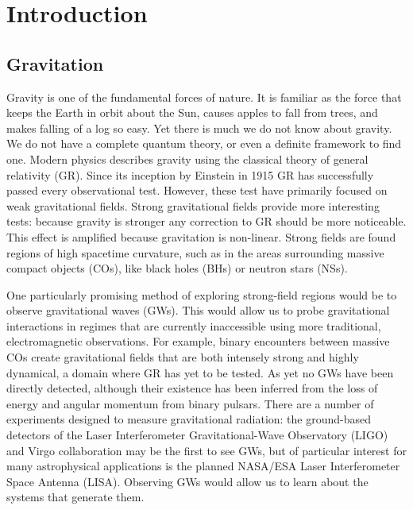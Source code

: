 \chapter{Introduction}\setcounter{page}{1}

\section{Gravitation}

Gravity is one of the fundamental forces of nature. It is familiar as the force that keeps the Earth in orbit about the Sun, causes apples to fall from trees, and makes falling of a log so easy. Yet there is much we do not know about gravity. We do not have a complete quantum theory, or even a definite framework to find one. Modern physics describes gravity using the classical theory of general relativity (GR)\cite{Misner1973}. Since its inception by Einstein in 1915 GR has successfully passed every observational test\cite{Will2006}. However, these test have primarily focused on weak gravitational fields. Strong gravitational fields provide more interesting tests: because gravity is stronger any correction to GR should be more noticeable. This effect is amplified because gravitation is non-linear. Strong fields are found regions of high spacetime curvature, such as in the areas surrounding massive compact objects (COs), like black holes (BHs) or neutron stars (NSs).

One particularly promising method of exploring strong-field regions would be to observe gravitational waves (GWs). This would allow us to probe gravitational interactions in regimes that are currently inaccessible using more traditional, electromagnetic observations. For example, binary encounters between massive COs create gravitational fields that are both intensely strong and highly dynamical, a domain where GR has yet to be tested. As yet no GWs have been directly detected, although their existence has been inferred from the loss of energy and angular momentum from binary pulsars\cite{Stairs2003}. There are a number of experiments designed to measure gravitational radiation: the ground-based detectors of the Laser Interferometer Gravitational-Wave Observatory (LIGO)\cite{Abramovici1992, Abbott2009} and Virgo\cite{Accadia2010} collaboration may be the first to see GWs, but of particular interest for many astrophysical applications is the planned NASA/ESA Laser Interferometer Space Antenna (LISA)\cite{Bender1998,Danzmann2003}. Observing GWs would allow us to learn about the systems that generate them.

